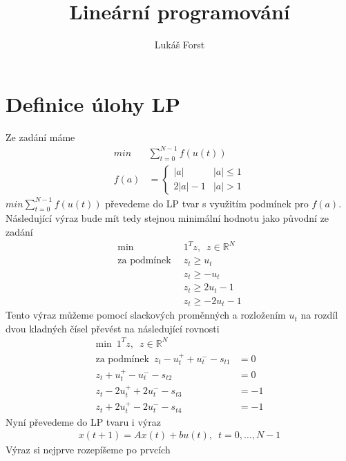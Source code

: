 \documentclass[12pt]{article}
\begin{document}
    \title{Lineární programování}
    \author{Lukáš Forst}
    \maketitle

    \section{Definice úlohy LP}\label{sec:definice-úlohy-lp}
    Ze zadání máme
    \begin{align*}
        min & \sum_{t=0}^{N-1}f(u(t))\\
        f(a) &= \left
        \{ \begin{array}{ll}
               |a| & |a|\leq 1\\
               2|a|-1 & |a| >1
        \end{array} \right.
    \end{align*}
    $min \sum_{t=0}^{N-1}f(u(t))$  převedeme do LP tvar s využitím podmínek pro $f(a)$.\\
    Následující výraz bude mít tedy stejnou minimální hodnotu jako původní ze zadání
    \begin{align*}
        \text{min} \enspace & 1^T z,\enspace z \in \mathbb{R}^N\\
        \text{za podmínek} \enspace & z_t \geq u_t\\
        &z_t  \geq -u_t\\
        &z_t  \geq 2u_t-1\\
        &z_t  \geq -2u_t-1
    \end{align*}
    Tento výraz můžeme pomocí slackových proměnných a rozložením \(u_t\) na rozdíl dvou kladných čísel převést na
    následující rovnosti
    \begin{align*}
        \text{min} \enspace 1^T z,\enspace z \in \mathbb{R}^N\\
        \text{za podmínek} \enspace z_t - u_t^+ + u_t^- - s_{t1} &= 0\\
        z_t + u_t^+ - u_t^- - s_{t2} &= 0\\
        z_t - 2u_t^+ + 2u_t^- - s_{t3} &= -1\\
        z_t + 2u_t^+ - 2u_t^- - s_{t4} &= -1
    \end{align*}
    Nyní převedeme do LP tvaru i výraz
    \begin{align*}
        x(t+1) = Ax(t) +bu(t), \enspace t = 0,\ldots,N-1
    \end{align*}
    Výraz si nejprve rozepíšeme po prvcích
\end{document}
